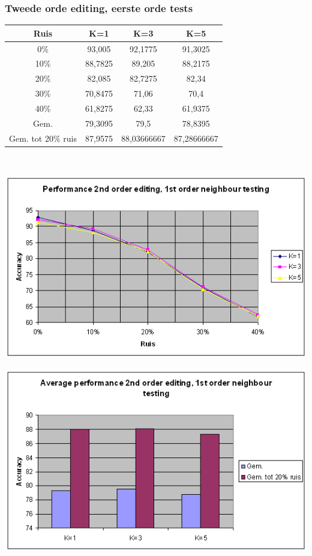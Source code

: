 \documentclass{article}
\begin{document}
\subsubsection{Tweede orde editing, eerste orde tests}
\begin{tabular}{|c|c|c|c|} \hline
Ruis &	K=1 &	K=3 &	K=5 \\ \hline
0\% &	93,005 &	92,1775 &	91,3025 \\
10\%	 & 88,7825 & 	89,205 &	88,2175 \\
20\%	 & 82,085	& 82,7275	& 82,34 \\
30\%	 & 70,8475	& 71,06 &	70,4 \\
40\%	 & 61,8275	 & 62,33 &	61,9375 \\
Gem.	& 79,3095	& 79,5 &	78,8395 \\
Gem. tot 20\% ruis &	87,9575 &	88,03666667 &	87,28666667 \\ \hline
\end{tabular} \\

\begin{center} \includegraphics[scale=0.7]{xor_2ndordedit_1stordtest_lijn} \end{center}
\begin{center} \includegraphics[scale=0.7]{xor_2ndordedit_1stordtest_staaf} \end{center}
\end{document}
